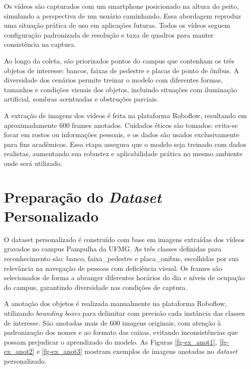 Os vídeos são capturados com um smartphone posicionado na altura do peito, simulando a perspectiva de um usuário caminhando. Essa abordagem reproduz uma situação prática de uso em aplicações futuras. Todos os vídeos seguem configuração padronizada de resolução e taxa de quadros para manter consistência na captura.

Ao longo da coleta, são priorizados pontos do campus que contenham os três objetos de interesse: bancos, faixas de pedestre e placas de ponto de ônibus. A diversidade dos cenários permite treinar o modelo com diferentes formas, tamanhos e condições visuais dos objetos, incluindo situações com iluminação artificial, sombras acentuadas e obstruções parciais.

A extração de imagens dos vídeos é feita na plataforma Roboflow, resultando em aproximadamente 600 frames anotados. Cuidados éticos são tomados: evita-se focar em rostos ou informações pessoais, e os dados são usados exclusivamente para fins acadêmicos. Essa etapa assegura que o modelo seja treinado com dados realistas, aumentando sua robustez e aplicabilidade prática no mesmo ambiente onde será utilizado.

\section{Preparação do \textit{Dataset} Personalizado}

O dataset personalizado é construído com base em imagens extraídas dos vídeos gravados no campus Pampulha da UFMG. As três classes definidas para reconhecimento são: banco, faixa\_pedestre e placa\_onibus, escolhidas por sua relevância na navegação de pessoas com deficiência visual. Os frames são selecionados de forma a abranger diferentes horários do dia e níveis de ocupação do campus, garantindo diversidade nas condições de captura.

A anotação dos objetos é realizada manualmente na plataforma Roboflow, utilizando \textit{bounding boxes} para delimitar com precisão cada instância das classes de interesse. São anotadas mais de 600 imagens originais, com atenção à padronização dos nomes e ao formato das caixas, evitando inconsistências que possam prejudicar o aprendizado do modelo. As Figuras \ref{fg-ex_anot1}, \ref{fg-ex_anot2} e \ref{fg-ex_anot3} mostram exemplos de imagens anotadas no \textit{dataset} personalizado.

